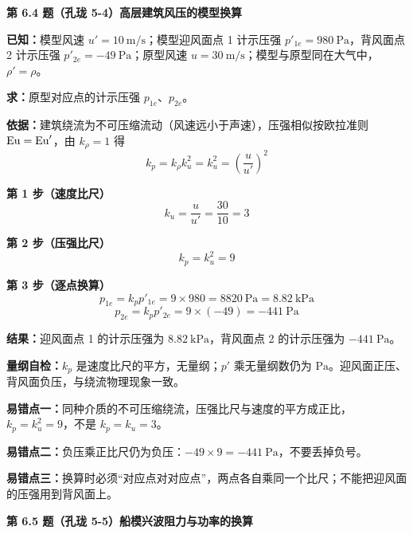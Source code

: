 \noindent\textbf{第 6.4 题（孔珑 5-4）\quad 高层建筑风压的模型换算}

\begin{jie}
\textbf{已知：}模型风速 $u'=10\ \mathrm{m/s}$；模型迎风面点 1 计示压强 $p'_{1e}=980\ \mathrm{Pa}$，背风面点 2 计示压强 $p'_{2e}=-49\ \mathrm{Pa}$；原型风速 $u=30\ \mathrm{m/s}$；模型与原型同在大气中，$\rho'=\rho$。

\textbf{求：}原型对应点的计示压强 $p_{1e}$、$p_{2e}$。

\textbf{依据：}建筑绕流为不可压缩流动（风速远小于声速），压强相似按欧拉准则 $\mathrm{Eu}=\mathrm{Eu}'$，由 $k_\rho=1$ 得
\[k_p=k_\rho k_u^{2}=k_u^{2}=\left(\frac{u}{u'}\right)^{2}\]

\textbf{第 1 步（速度比尺）}\quad
\[k_u=\frac{u}{u'}=\frac{30}{10}=3\]

\textbf{第 2 步（压强比尺）}\quad
\[k_p=k_u^{2}=9\]

\textbf{第 3 步（逐点换算）}\quad
\[p_{1e}=k_p p'_{1e}=9\times980=8820\ \mathrm{Pa}=8.82\ \mathrm{kPa}\]
\[p_{2e}=k_p p'_{2e}=9\times(-49)=-441\ \mathrm{Pa}\]

\textbf{结果：}迎风面点 1 的计示压强为 $8.82\ \mathrm{kPa}$，背风面点 2 的计示压强为 $-441\ \mathrm{Pa}$。

\textbf{量纲自检：}$k_p$ 是速度比尺的平方，无量纲；$p'$ 乘无量纲数仍为 $\mathrm{Pa}$。迎风面正压、背风面负压，与绕流物理现象一致。
\end{jie}

\begin{yicuo}
\textbf{易错点一：}同种介质的不可压缩绕流，压强比尺与速度的平方成正比，$k_p=k_u^{2}=9$，不是 $k_p=k_u=3$。

\textbf{易错点二：}负压乘正比尺仍为负压：$-49\times9=-441\ \mathrm{Pa}$，不要丢掉负号。

\textbf{易错点三：}换算时必须“对应点对对应点”，两点各自乘同一个比尺；不能把迎风面的压强用到背风面上。
\end{yicuo}

\noindent\textbf{第 6.5 题（孔珑 5-5）\quad 船模兴波阻力与功率的换算}

